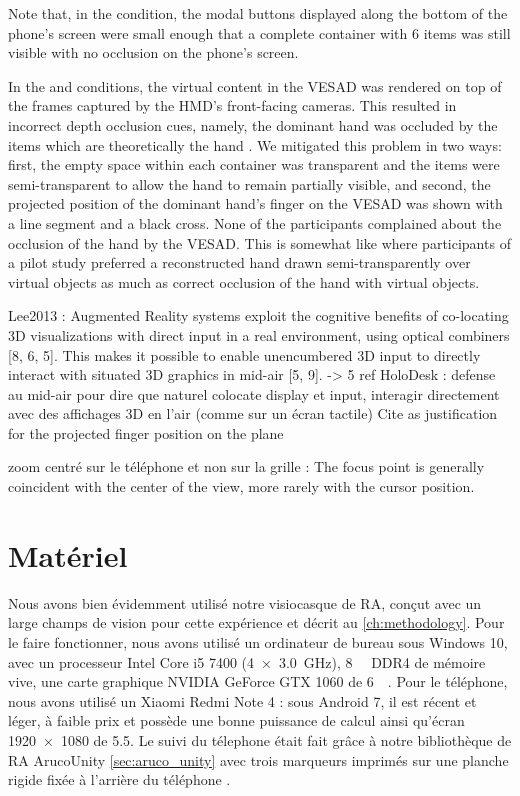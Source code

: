 Note that, in the  condition, the modal buttons displayed along the bottom of the phone's screen were small enough that a complete container with 6 items was still visible with no occlusion on the phone's screen.

In the  and  conditions, the virtual content in the VESAD was rendered on top of the frames captured by the HMD's front-facing cameras. This resulted in incorrect depth occlusion cues, namely, the dominant hand was occluded by the items which are theoretically  the hand . We mitigated this problem in two ways: first, the empty space within each container was transparent and the items were semi-transparent to allow the hand to remain partially visible, and second, the projected position of the dominant hand's finger on the VESAD was shown with a line segment and a black cross. None of the participants complained about the occlusion of the hand by the VESAD. This is somewhat like \cite[Figure 3c]{Piumsomboon2014} where participants of a pilot study preferred a reconstructed hand drawn semi-transparently over virtual objects as much as correct occlusion of the hand with virtual objects.

Lee2013 : Augmented Reality systems exploit the cognitive benefits of co-locating 3D visualizations with direct input in a real environment, using optical combiners [8, 6, 5]. This makes it possible to enable unencumbered 3D input to directly interact with situated 3D graphics in mid-air [5, 9]. -> 5 ref HoloDesk : defense au mid-air pour dire que naturel colocate display et input, interagir directement avec des affichages 3D en l'air (comme sur un écran tactile)
Cite \cite{Chan2010} as justification for the projected finger position on the plane

zoom centré sur le téléphone et non sur la grille : The focus point is generally coincident with the center of the view, more rarely with the cursor position. \cite{Guiard2004}


\section{Matériel}
\label{sec:experiment_material}

Nous avons bien évidemment utilisé notre visiocasque de RA, conçut avec un large champs de vision pour cette expérience et décrit au \autoref{ch:methodology}. Pour le faire fonctionner, nous avons utilisé un ordinateur de bureau sous Windows 10, avec un processeur Intel Core i5 7400 (\SI[product-units = single]{4x3.0}{\GHz}), \SI{8}{\giga\byte} DDR4 de mémoire vive, une carte graphique NVIDIA GeForce GTX 1060 de \SI{6}{\giga\byte}. Pour le téléphone, nous avons utilisé un Xiaomi Redmi Note 4 : sous Android 7, il est récent et léger, à faible prix et possède une bonne puissance de calcul ainsi qu'écran \SI{1920x1080}{\px} de \SI{5.5}{\inch}. Le suivi du télephone était fait grâce à notre bibliothèque de RA ArucoUnity \autoref{sec:aruco_unity} avec trois marqueurs imprimés sur une planche rigide fixée à l'arrière du téléphone .

